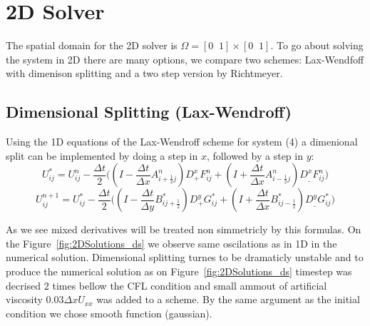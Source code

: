 
\section{2D Solver}
The spatial domain for the 2D solver is $\Omega=[0\;\;1]\times[0\;\;1]$. To go about solving the system in 2D there are many options,
we compare two schemes: Lax-Wendfoff with dimenison splitting and a two step version by Richtmeyer. \newline

\subsection{Dimensional Splitting (Lax-Wendroff)}

Using the 1D equations of the Lax-Wendroff scheme for system (4) a dimenional split can be implemented by 
doing a step in $x$, followed by a step in $y$: 
\begin{equation}\label{eqn:6}
U_{ij}^* = U_{ij}^n - \frac{\Delta t}{2} 
\bigg(( I- \frac{\Delta t}{\Delta x} A_{i+\frac{1}{2}j}^n ) D_+^xF_{ij}^n 
+ (I+ \frac{\Delta t}{\Delta x} A_{i-\frac{1}{2}j}^n) D_{\_}^xF_{ij}^n\bigg)
\end{equation}
\begin{equation}\label{eqn:7}
U_{ij}^{n+1} = U_{ij}^* - 
\frac{\Delta t}{2} \bigg((I - \frac{\Delta t}{\Delta y} B_{ij+\frac{1}{2}}^*) D_+^yG_{ij}^*
 +(I + \frac{\Delta t}{\Delta x} B_{ij-\frac{1}{2}}^*) D_{\_}^y G_{ij}^* \bigg)
\end{equation}

As we see mixed derivatives will be treated non simmetricly by this formulas. On the Figure~\ref{fig:2DSolutions_ds} we observe same oscilations as in 1D in the numerical solution.
Dimensional splitting turnes to be dramaticly unstable and to produce the numerical solution as on Figure~\ref{fig:2DSolutions_ds} timestep was decrised
2 times bellow the CFL condition and small ammout of artificial viscosity $0.03 \Delta x U_{xx}$ was added to a scheme. By the same argument as the initial condition
we chose smooth function (gaussian). 

